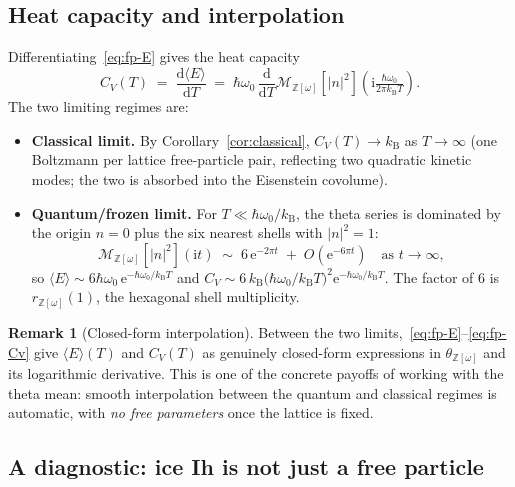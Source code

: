 \documentclass[11pt,letterpaper]{article}
\theoremstyle{plain}
\theoremstyle{definition}
\newtheorem{remark}[theorem]{Remark}
\newcommand{\Eisenstein}{\mathbb{Z}[\omega]}
\newcommand{\tmeaneis}[1]{\mathcal{M}_{\Eisenstein}[#1]}
\newcommand{\e}{\mathrm{e}}
\begin{document}
\subsection{Heat capacity and interpolation}

Differentiating~\eqref{eq:fp-E} gives the heat capacity
\begin{equation}\label{eq:fp-Cv}
  C_V(T) \;=\; \frac{\mathrm{d}\langle E\rangle}{\mathrm{d}T}
    \;=\; \hbar\omega_0\,\frac{\mathrm{d}}{\mathrm{d}T}
      \tmeaneis{|n|^2}\!\left(\mathrm{i}\tfrac{\hbar\omega_0}{2\pi k_{\mathrm{B}} T}\right).
\end{equation}
The two limiting regimes are:
\begin{itemize}[leftmargin=2em]
\item \textbf{Classical limit.}  By Corollary~\ref{cor:classical},
  $C_V(T) \to k_{\mathrm{B}}$ as $T\to\infty$ (one Boltzmann per
  lattice free-particle pair, reflecting two quadratic kinetic
  modes; the two is absorbed into the Eisenstein covolume).
\item \textbf{Quantum/frozen limit.}  For $T\ll
  \hbar\omega_0/k_{\mathrm{B}}$, the theta series is dominated by
  the origin $n=0$ plus the six nearest shells with $|n|^2=1$:
  \begin{equation}\label{eq:fp-frozen}
    \tmeaneis{|n|^2}(\mathrm{i} t)
      \;\sim\; 6\,\e^{-2\pi t} \;+\; O(\e^{-6\pi t})
    \quad\text{as } t\to\infty,
  \end{equation}
  so $\langle E\rangle\sim 6\hbar\omega_0\,\e^{-\hbar\omega_0/k_{\mathrm{B}} T}$
  and $C_V\sim 6\,k_{\mathrm{B}}
  \bigl(\hbar\omega_0/k_{\mathrm{B}} T\bigr)^{2}
  \e^{-\hbar\omega_0/k_{\mathrm{B}} T}$.  The factor of $6$ is
  $r_{\Eisenstein}(1)$, the hexagonal shell multiplicity.
\end{itemize}

\begin{remark}[Closed-form interpolation]
Between the two limits,~\eqref{eq:fp-E}--\eqref{eq:fp-Cv} give
$\langle E\rangle(T)$ and $C_V(T)$ as genuinely closed-form
expressions in $\theta_{\Eisenstein}$ and its logarithmic
derivative.  This is one of the concrete payoffs of working with
the theta mean: smooth interpolation between the quantum and
classical regimes is automatic, with \emph{no free parameters}
once the lattice is fixed.
\end{remark}

\subsection{A diagnostic: ice Ih is not just a free particle}
\label{sec:diagnostic}
\end{document}
